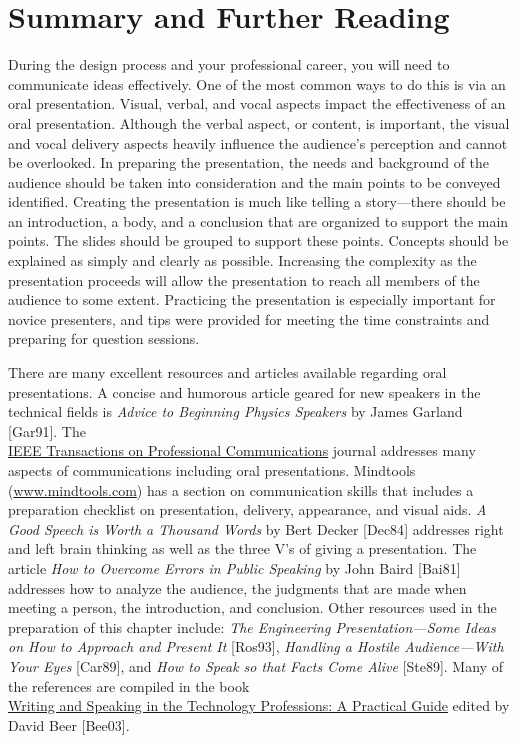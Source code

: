 \begin{table}
\begin{tabular}{|m{10cm}|m{1.5cm}|}
\end{tabular}
\end{table}


\section{Summary and Further Reading}
\label{section:summary-and-further-reading}

During the design process and your professional career, you will need to
communicate ideas effectively. One of the most common ways to do this is
via an oral presentation. Visual, verbal, and vocal aspects impact the
effectiveness of an oral presentation. Although the verbal aspect, or
content, is important, the visual and vocal delivery aspects heavily
influence the audience's perception and cannot be overlooked. In
preparing the presentation, the needs and background of the audience
should be taken into consideration and the main points to be conveyed
identified. Creating the presentation is much like telling a
story---there should be an introduction, a body, and a conclusion that
are organized to support the main points. The slides should be grouped
to support these points. Concepts should be explained as simply and
clearly as possible. Increasing the complexity as the presentation
proceeds will allow the presentation to reach all members of the
audience to some extent. Practicing the presentation is especially
important for novice presenters, and tips were provided for meeting the
time constraints and preparing for question sessions.

There are many excellent resources and articles available regarding oral
presentations. A concise and humorous article geared for new speakers in
the technical fields is \emph{Advice to Beginning Physics Speakers} by
James Garland {[}Gar91{]}. The \\ \ul{IEEE Transactions on Professional 
Communications} journal addresses many aspects of communications
including oral presentations. Mindtools
(\href{http://www.mindtools.com}{www.mindtools.com}) has a section on
communication skills that includes a preparation checklist on
presentation, delivery, appearance, and visual aids. \emph{A Good Speech
is Worth a Thousand Words} by Bert Decker {[}Dec84{]} addresses right
and left brain thinking as well as the three V's of giving a
presentation. The article \emph{How to Overcome Errors in Public
Speaking} by John Baird {[}Bai81{]} addresses how to analyze the
audience, the judgments that are made when meeting a person, the
introduction, and conclusion. Other resources used in the preparation of
this chapter include: \emph{The Engineering Presentation---Some Ideas on
How to Approach and Present It} {[}Ros93{]}, \emph{Handling a Hostile
Audience---With Your Eyes} {[}Car89{]}, and \emph{How to Speak so that
Facts Come Alive} {[}Ste89{]}. Many of the references are compiled in
the book \\ \ul{Writing and Speaking in the Technology Professions: A
Practical Guide} edited by David Beer {[}Bee03{]}.
